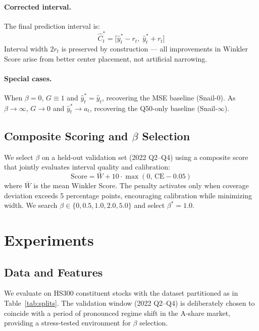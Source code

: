 \documentclass[12pt, a4paper]{article}
\begin{document}
\paragraph{Corrected interval.}
The final prediction interval is:
%
\begin{equation}
\hat{C}_t^* = \bigl[\hat{y}^*_t - r_t,\;\hat{y}^*_t + r_t\bigr]
\end{equation}
%
Interval width $2r_t$ is preserved by construction --- all improvements in Winkler
Score arise from better center placement, not artificial narrowing.

\paragraph{Special cases.}
When $\beta = 0$, $G \equiv 1$ and $\hat{y}^*_t = \hat{y}_t$, recovering the MSE
baseline (Snail-0). As $\beta \to \infty$, $G \to 0$ and $\hat{y}^*_t \to a_t$,
recovering the Q50-only baseline (Snail-$\infty$).

\subsection{Composite Scoring and $\beta$ Selection}

We select $\beta$ on a held-out validation set (2022 Q2--Q4) using a composite score
that jointly evaluates interval quality and calibration:
%
\begin{equation}
\text{Score} = \bar{W} + 10 \cdot \max(0,\, \text{CE} - 0.05)
\end{equation}
%
where $\bar{W}$ is the mean Winkler Score. The penalty activates only when coverage
deviation exceeds 5 percentage points, encouraging calibration while minimizing width.
We search $\beta \in \{0, 0.5, 1.0, 2.0, 5.0\}$ and select $\beta^* = 1.0$.

\section{Experiments}

\subsection{Data and Features}

We evaluate on HS300 constituent stocks with the dataset partitioned as in
Table~\ref{tab:splits}. The validation window (2022 Q2--Q4) is deliberately chosen
to coincide with a period of pronounced regime shift in the A-share market, providing
a stress-tested environment for $\beta$ selection.
\end{document}
